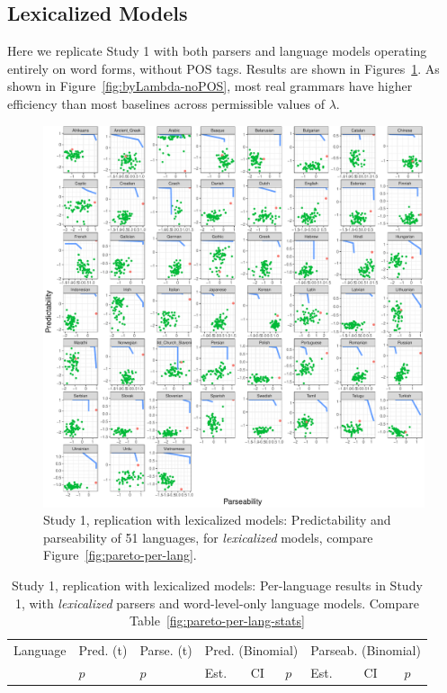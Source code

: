 \documentclass[10pt,twoside,lineno]{article}
\begin{document}
\subsection{Lexicalized Models}






Here we replicate Study 1 with both parsers and language models operating entirely on word forms, without POS tags.
Results are shown in Figures~\ref{fig:pareto-plane-noPOS}.
As shown in Figure~\ref{fig:byLambda-noPOS}, most real grammars have higher efficiency than most baselines across permissible values of $\lambda$.

\begin{figure}
\centering
\includegraphics[width=\textwidth]{../results/plane/unlexicalized/pareto-plane-perLanguage-lexicalized.pdf}
	\caption[Predictability and Parseability]{Study 1, replication with lexicalized models: Predictability and parseability of 51 languages, for \emph{lexicalized} models, compare Figure~\ref{fig:pareto-per-lang}.}\label{fig:pareto-plane-noPOS}
\end{figure}


\begin{table}
\centering
\small{
\begin{tabular}{l||ll|lll|lll}
Language & Pred. (t) & Parse. (t) & \multicolumn{3}{c|}{Pred. (Binomial)} & \multicolumn{3}{c}{Parseab. (Binomial)} \\ 
&  $p$ & $p$ &  Est. &CI & $p$ & Est. & CI & $p$  \\ \hline \hline

\end{tabular}
}
	\caption{Study 1, replication with lexicalized models: Per-language results in Study 1, with \emph{lexicalized} parsers and word-level-only language models. Compare Table~\ref{fig:pareto-per-lang-stats}}\label{tab:pareto-plane-noPOS}
\end{table}
\end{document}
